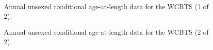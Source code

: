 \documentclass[
]{scrartcl}
\begin{document}
\clearpage

\begin{figure}


\caption{\label{fig-NWFSC_agecomps1}Annual unsexed conditional
age-at-length data for the WCBTS (1 of 2).}

\end{figure}%

\begin{figure}


\caption{\label{fig-NWFSC_agecomps2}Annual unsexed conditional
age-at-length data for the WCBTS (2 of 2).}

\end{figure}%
\end{document}

